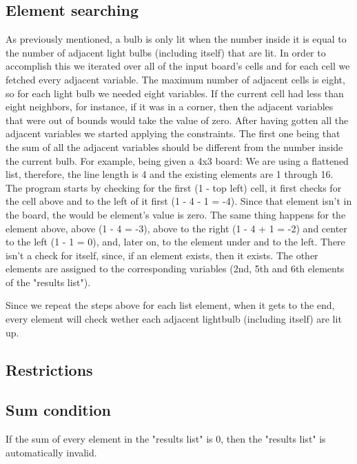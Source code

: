 \documentclass[runningheads]{llncs}
\begin{document}
\subsection{Element searching}
As previously mentioned, a bulb is only lit when the number inside it is equal to the number of adjacent light bulbs (including itself) that are lit. In order to accomplish this we iterated over all of the input board's cells and for each cell we fetched every adjacent variable. The maximum number of adjacent cells is eight, so for each light bulb we needed eight variables. If the current cell had less than eight neighbors, for instance, if it was in a corner, then the adjacent variables that were out of bounds would take the value of zero.
After having gotten all the adjacent variables we started applying the constraints. The first one being that the sum of all the adjacent variables should be different from the number inside the current bulb.
For example, being given a 4x3 board:
We are using a flattened list, therefore, the line length is 4 and the existing elements are 1 through 16.
The program starts by checking for the first (1 - top left) cell, it first checks for the cell above and to the left of it first (1 - 4 - 1 = -4). Since that element isn't in the board, the would be element's value is zero.
The same thing happens for the element above, above (1 - 4 = -3), above to the right (1 - 4 + 1 = -2) and center to the left (1 - 1 = 0), and, later on, to the element under and to the left.
There isn't a check for itself, since, if an element exists, then it exists.
The other elements are assigned to the corresponding variables (2nd, 5th and 6th elements of the "results list").

Since we repeat the steps above for each list element, when it gets to the end, every element will check wether each adjacent lightbulb (including itself) are lit up.


\clearpage
\subsection{Restrictions}
\subsection*{Sum condition}
If the sum of every element in the "results list" is 0, then the "results list" is automatically invalid.
\end{document}

